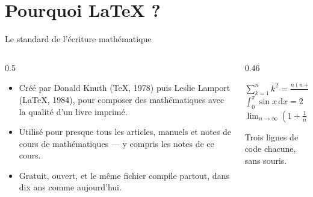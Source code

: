 \section{Pourquoi \texorpdfstring{\LaTeX}{LaTeX} ?}

\begin{frame}{Le standard de l'écriture mathématique}
  \small
  \begin{columns}[c]
    \begin{column}{0.5\textwidth}
      \begin{itemize}
        \item Créé par Donald Knuth (\TeX, 1978) puis Leslie Lamport
          (\LaTeX, 1984), pour composer des mathématiques avec la qualité
          d'un livre imprimé.
        \item Utilisé pour presque tous les articles, manuels et notes de
          cours de mathématiques --- y compris les notes de ce cours.
        \item Gratuit, ouvert, et le même fichier compile partout, dans
          dix ans comme aujourd'hui.
      \end{itemize}
    \end{column}
    \begin{column}{0.46\textwidth}
      \begin{tcolorbox}[codestyle]
        \centering
        $\displaystyle \sum_{k=1}^{n} k^2 = \frac{n(n+1)(2n+1)}{6}$
        \\[8pt]
        $\displaystyle \int_0^{\pi} \sin x \,\mathrm{d}x = 2$
        \\[8pt]
        $\displaystyle \lim_{n\to\infty}\left(1+\frac1n\right)^{\!n} = \mathrm{e}$
      \end{tcolorbox}
      \centering\scriptsize Trois lignes de code chacune, sans souris.
    \end{column}
  \end{columns}
\end{frame}

